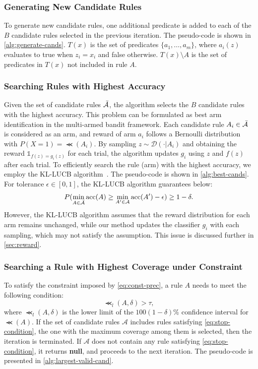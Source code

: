 \documentclass[runningheads]{llncs}
\begin{document}
\subsubsection{Generating New Candidate Rules}
To generate new candidate rules,
one additional predicate is added to each of the $B$ candidate rules
selected in the previous iteration.
The pseudo-code is shown in \cref{alg:generate-cands}.
$T(x)$ is the set of predicates $\{a_1,\dots,a_m\}$,
where $a_i(z)$ evaluates to true when $z_i=x_i$ and false otherwise.
$T(x)\setminus A$ is the set of predicates in $T(x)$ not included in rule $A$.

\subsubsection{Searching Rules with Highest Accuracy}
Given the set of candidate rules $\bar{\mathcal{A}}$,
the algorithm selects the $B$ candidate rules with the highest accuracy.
This problem can be formulated
as best arm identification in the multi-armed bandit framework.
Each candidate rule $A_i\in\bar{\mathcal{A}}$ is considered as an arm,
and reward of arm $a_i$ follows a Bernoulli distribution
with $P(X=1)=\Prec(A_i)$.
By sampling $z\sim\mathcal{D}(\cdot|A_i)$
and obtaining the reward $\mathds{1}_{f(z)=g_i(z)}$ for each trial,
the algorithm updates $g_i$ using $z$ and $f(z)$ after each trial.
To efficiently search the rule (arm) with the highest accuracy,
we employ the KL-LUCB algorithm~\cite{kaufmann2013information}.
The pseudo-code is shown in \cref{alg:best-cands}.
For tolerance $\epsilon\in[0,1]$, the KL-LUCB algorithm guarantees below:
\begin{equation}
  P(\underset{A\in\bar{\mathcal{A}}}{\min}\operatorname{acc}(A)\ge
  \underset{A'\in\mathcal{A}}{\min}\operatorname{acc}(A')-\epsilon)\ge1-\delta.
\end{equation}
However,
the KL-LUCB algorithm assumes that the reward distribution for each arm
remains unchanged,
while our method updates the classifier $g_i$ with each sampling,
which may not satisfy the assumption.
This issue is discussed further in \cref{sec:reward}.

\subsubsection{Searching a Rule with Highest Coverage under Constraint}
To satisfy the constraint imposed by \cref{eq:const-prec},
a rule $A$ needs to meet the following condition:
\begin{equation}
  \Prec_{l}(A,\delta)>\tau,\label{eq:stop-condition}
\end{equation}
where $\Prec_{l}(A,\delta)$ is the lower limit of
the $100(1-\delta)$\% confidence interval for $\Prec(A)$.
If the set of candidate rules $\mathcal{A}$
includes rules satisfying \cref{eq:stop-condition},
the one with the maximum coverage among them is selected,
then the iteration is terminated.
If $\mathcal{A}$ does not contain any rule satisfying \cref{eq:stop-condition},
it returns \textbf{null},
and proceeds to the next iteration.
The pseudo-code is presented in \cref{alg:largest-valid-cand}.
\end{document}
